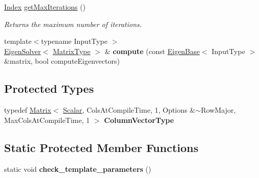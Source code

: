 \begin{DoxyCompactItemize}
\mbox{\hyperlink{class_eigen_1_1_eigen_solver_a5bff6a6bc0efac67d52c60c2c3deb9ee}{Index}} \mbox{\hyperlink{class_eigen_1_1_eigen_solver_aa7668af4bcb47cd92cfe10640589d88f}{get\+Max\+Iterations}} ()
\begin{DoxyCompactList}\small\item\em Returns the maximum number of iterations. \end{DoxyCompactList}\item 
\mbox{\label{class_eigen_1_1_eigen_solver_a99e6120839b1f65c4e1f1ba61efa264e}} 
{\footnotesize template$<$typename Input\+Type $>$ }\\\mbox{\hyperlink{class_eigen_1_1_eigen_solver}{Eigen\+Solver}}$<$ \mbox{\hyperlink{class_eigen_1_1_eigen_solver_a83acd180404ddaac8a678fa65a6b632b}{Matrix\+Type}} $>$ \& {\bfseries compute} (const \mbox{\hyperlink{struct_eigen_1_1_eigen_base}{Eigen\+Base}}$<$ Input\+Type $>$ \&matrix, bool compute\+Eigenvectors)
\end{DoxyCompactItemize}
\subsection*{Protected Types}
\begin{DoxyCompactItemize}
\item 
\mbox{\label{class_eigen_1_1_eigen_solver_aac6c2c50adc1930bbb9fa7cfc699474a}} 
typedef \mbox{\hyperlink{class_eigen_1_1_matrix}{Matrix}}$<$ \mbox{\hyperlink{class_eigen_1_1_eigen_solver_a017d49fe0d59874b70a2fcf35e5aa373}{Scalar}}, Cols\+At\+Compile\+Time, 1, Options \&$\sim$Row\+Major, Max\+Cols\+At\+Compile\+Time, 1 $>$ {\bfseries Column\+Vector\+Type}
\end{DoxyCompactItemize}
\subsection*{Static Protected Member Functions}
\begin{DoxyCompactItemize}
\item 
\mbox{\label{class_eigen_1_1_eigen_solver_a92a45b56df13f177983697d50aed2df2}} 
static void {\bfseries check\+\_\+template\+\_\+parameters} ()
\end{DoxyCompactItemize}
